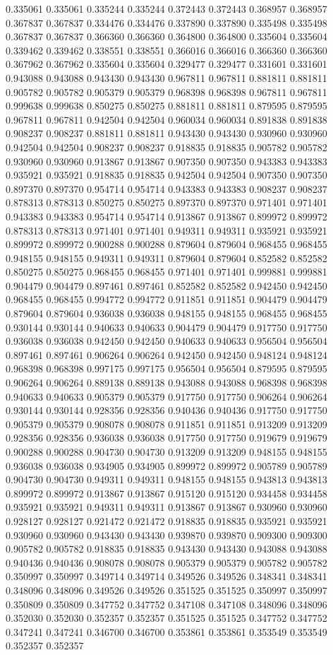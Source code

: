 0.335061 0.335061 0.335244 0.335244 0.372443 0.372443 0.368957 0.368957 0.367837 0.367837 0.334476 0.334476 0.337890 0.337890 0.335498 0.335498 0.367837 0.367837 0.366360 0.366360 0.364800 0.364800 0.335604 0.335604 0.339462 0.339462 0.338551 0.338551 0.366016 0.366016 0.366360 0.366360 0.367962 0.367962 0.335604 0.335604 0.329477 0.329477 0.331601 0.331601 0.943088 0.943088 0.943430 0.943430 0.967811 0.967811 0.881811 0.881811 0.905782 0.905782 0.905379 0.905379 0.968398 0.968398 0.967811 0.967811 0.999638 0.999638 0.850275 0.850275 0.881811 0.881811 0.879595 0.879595 0.967811 0.967811 0.942504 0.942504 0.960034 0.960034 0.891838 0.891838 0.908237 0.908237 0.881811 0.881811 0.943430 0.943430 0.930960 0.930960 0.942504 0.942504 0.908237 0.908237 0.918835 0.918835 0.905782 0.905782 0.930960 0.930960 0.913867 0.913867 0.907350 0.907350 0.943383 0.943383 0.935921 0.935921 0.918835 0.918835 0.942504 0.942504 0.907350 0.907350 0.897370 0.897370 0.954714 0.954714 0.943383 0.943383 0.908237 0.908237 0.878313 0.878313 0.850275 0.850275 0.897370 0.897370 0.971401 0.971401 0.943383 0.943383 0.954714 0.954714 0.913867 0.913867 0.899972 0.899972 0.878313 0.878313 0.971401 0.971401 0.949311 0.949311 0.935921 0.935921 0.899972 0.899972 0.900288 0.900288 0.879604 0.879604 0.968455 0.968455 0.948155 0.948155 0.949311 0.949311 0.879604 0.879604 0.852582 0.852582 0.850275 0.850275 0.968455 0.968455 0.971401 0.971401 0.999881 0.999881 0.904479 0.904479 0.897461 0.897461 0.852582 0.852582 0.942450 0.942450 0.968455 0.968455 0.994772 0.994772 0.911851 0.911851 0.904479 0.904479 0.879604 0.879604 0.936038 0.936038 0.948155 0.948155 0.968455 0.968455 0.930144 0.930144 0.940633 0.940633 0.904479 0.904479 0.917750 0.917750 0.936038 0.936038 0.942450 0.942450 0.940633 0.940633 0.956504 0.956504 0.897461 0.897461 0.906264 0.906264 0.942450 0.942450 0.948124 0.948124 0.968398 0.968398 0.997175 0.997175 0.956504 0.956504 0.879595 0.879595 0.906264 0.906264 0.889138 0.889138 0.943088 0.943088 0.968398 0.968398 0.940633 0.940633 0.905379 0.905379 0.917750 0.917750 0.906264 0.906264 0.930144 0.930144 0.928356 0.928356 0.940436 0.940436 0.917750 0.917750 0.905379 0.905379 0.908078 0.908078 0.911851 0.911851 0.913209 0.913209 0.928356 0.928356 0.936038 0.936038 0.917750 0.917750 0.919679 0.919679 0.900288 0.900288 0.904730 0.904730 0.913209 0.913209 0.948155 0.948155 0.936038 0.936038 0.934905 0.934905 0.899972 0.899972 0.905789 0.905789 0.904730 0.904730 0.949311 0.949311 0.948155 0.948155 0.943813 0.943813 0.899972 0.899972 0.913867 0.913867 0.915120 0.915120 0.934458 0.934458 0.935921 0.935921 0.949311 0.949311 0.913867 0.913867 0.930960 0.930960 0.928127 0.928127 0.921472 0.921472 0.918835 0.918835 0.935921 0.935921 0.930960 0.930960 0.943430 0.943430 0.939870 0.939870 0.909300 0.909300 0.905782 0.905782 0.918835 0.918835 0.943430 0.943430 0.943088 0.943088 0.940436 0.940436 0.908078 0.908078 0.905379 0.905379 0.905782 0.905782 0.350997 0.350997 0.349714 0.349714 0.349526 0.349526 0.348341 0.348341 0.348096 0.348096 0.349526 0.349526 0.351525 0.351525 0.350997 0.350997 0.350809 0.350809 0.347752 0.347752 0.347108 0.347108 0.348096 0.348096 0.352030 0.352030 0.352357 0.352357 0.351525 0.351525 0.347752 0.347752 0.347241 0.347241 0.346700 0.346700 0.353861 0.353861 0.353549 0.353549 0.352357 0.352357 